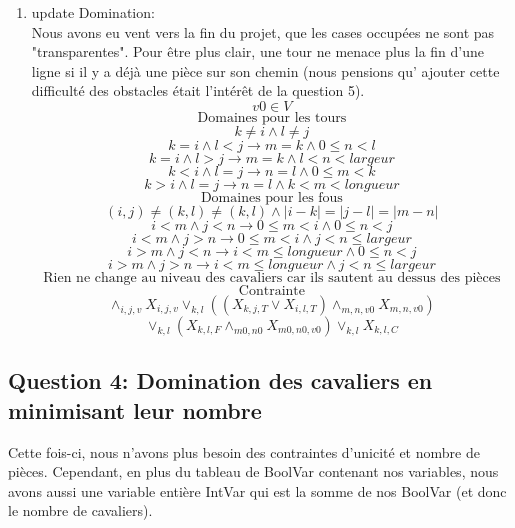 \begin{enumerate}
    \item update Domination:\\
    Nous avons eu vent vers la fin du projet, que les cases occupées ne sont pas "transparentes". Pour être plus clair, une tour ne menace plus la fin d'une ligne si il y a déjà une pièce sur son chemin (nous pensions qu' ajouter cette difficulté des obstacles était l'intérêt de la question 5).\\
    \[ v0 \in V \]
    \[ \text{Domaines pour les tours} \]
    \[ k \neq i \land l \neq j\]
    \[ k = i \land l < j \longrightarrow  m=k \land 0 \leq n < l\]
    \[ k = i \land l > j \longrightarrow  m=k \land l < n < largeur  \]
    \[ k < i \land l = j \longrightarrow  n=l \land 0 \leq m < k\]
    \[ k > i \land l = j \longrightarrow  n=l \land k < m < longueur  \]
    \[ \text{Domaines pour les fous} \]
    \[ (i,j) \neq (k,l) \neq (k,l) \land |i-k| = |j-l| = |m-n| \]
    \[ i < m \land j < n \longrightarrow 0 \leq m < i \land 0 \leq n < j\]
    \[ i < m \land j > n \longrightarrow 0 \leq m < i \land j < n \leq largeur\]
    \[ i > m \land j < n \longrightarrow i < m \leq longueur \land 0 \leq n < j\]
    \[ i > m \land j > n \longrightarrow i < m \leq longueur \land j < n \leq largeur\]
    \[ \text{Rien ne change au niveau des cavaliers car ils sautent au dessus des pièces} \]
    \[ \text{Contrainte} \]
    \[  \land_{i,j,v} X_{i,j,v} \lor_{k,l} ( ( X_{k,j,T} \lor X_{i,l,T} ) \land_{m,n,v0} X_{m,n,v0} ) \] 
    \[ \lor_{k,l} ( X_{k,l,F} \land_{m0,n0} X_{m0,n0,v0} ) \lor_{k,l} X_{k,l,C} \]
\end{enumerate}



\subsection{Question 4: Domination des cavaliers en minimisant leur nombre}
Cette fois-ci, nous n'avons plus besoin des contraintes d'unicité et nombre de pièces. Cependant, en plus du tableau de BoolVar contenant nos variables, nous avons aussi une variable entière IntVar qui est la somme de nos BoolVar (et donc le nombre de cavaliers).

